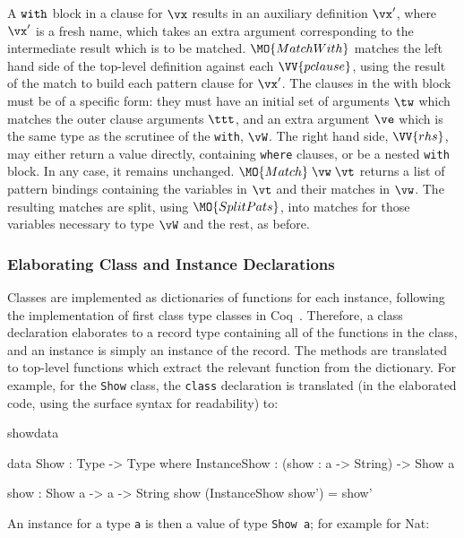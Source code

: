 A $\mathtt{with}$ block in a clause for $\vx$
results in an auxiliary definition $\vx'$, where $\vx'$ is a fresh name,
which takes an extra argument corresponding to the intermediate result which
is to be matched.
$\MO{MatchWith}$ matches the left hand side of the top-level definition against
each $\VV{pclause}$, using the result of the match to build each pattern clause
for $\vx'$. 
The clauses in the with block must be of a specific form: they must have an initial
set of arguments $\tw$ which matches the outer clause arguments
$\ttt$, and an extra argument
$\ve$ which is the same type as the scrutinee of the \texttt{with}, $\vW$.
The right hand side, $\VV{rhs}$, may either return a value directly, containing 
\texttt{where} clauses, or be a nested \texttt{with} block. In any case, it
remains unchanged.
$\MO{Match}\;\vw\;\vt$ returns a list of pattern bindings containing
the variables in $\vt$ and their matches in $\vw$.
The resulting matches are split, using $\MO{SplitPats}$, into matches for those
variables necessary to type $\vW$ and the rest, as before.

\subsubsection{Elaborating Class and Instance Declarations}

Classes are implemented as dictionaries of functions for each instance,
following the implementation of first class type classes in Coq~\cite{Sozeau2008}.
Therefore, a class declaration elaborates to a record type containing all
of the functions in the class, and an instance is simply an instance of the
record. The methods are translated to top-level functions which extract the
relevant function from the dictionary.  For example, for the \texttt{Show}
class, the \texttt{class} declaration is translated (in the elaborated code,
using the surface \Idris{} syntax for readability)
to:

\begin{SaveVerbatim}{showdata}

data Show : Type -> Type where
    InstanceShow : (show : a -> String) -> Show a

show : Show a -> a -> String
show (InstanceShow show') = show'

\end{SaveVerbatim}

\noindent
An instance for a type \texttt{a} is then a value of type \texttt{Show a}; for example for Nat:

